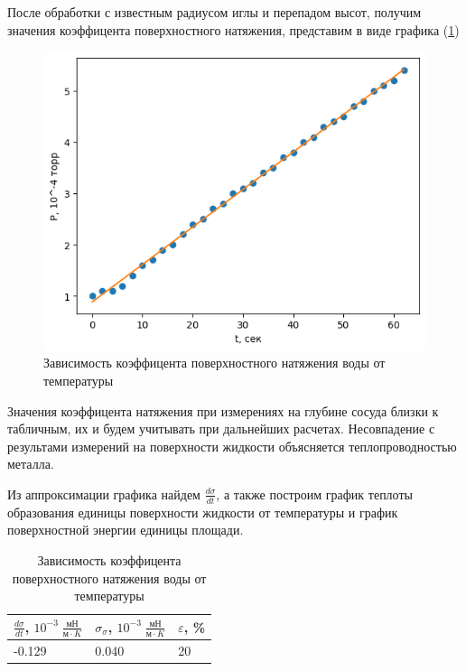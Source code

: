 \documentclass[a4paper,12pt]{article}
\begin{document}
После обработки с известным радиусом иглы и перепадом высот, получим значения коэффицента поверхностного натяжения, представим в виде графика (\ref{sigma})
\begin{figure}[H]
    \begin{center}
        \includegraphics[width=\textwidth]{data/plot1.png}
    \end{center}
    \caption{Зависимость коэффицента поверхностного натяжения воды от температуры} \label{sigma}
\end{figure}
Значения коэффицента натяжения при измерениях на глубине сосуда близки к табличным, их и будем учитывать при дальнейших расчетах. Несовпадение с результами измерений на поверхности жидкости объясняется теплопроводностью металла.

Из аппроксимации графика найдем $\frac{d\sigma}{dt}$, а также построим график теплоты образования единицы поверхности жидкости от температуры и график поверхностной энергии единицы площади.

\begin{table}[H]
    \caption{Зависимость коэффицента поверхностного натяжения воды от температуры}
    \label{dsigma}
    \begin{tabular}{|l|l|l|}
        \hline
        $\frac{d\sigma}{dt}$, $10^{-3}\;   \frac{\text{мН}}{\text{м} \cdot K}$ & $\sigma_\sigma$, $10^{-3}\; \frac{\text{мН}}{\text{м} \cdot K}$ & $\varepsilon$, \% \\ \hline
        -0.129                                                                 & 0.040                                                           & 20                \\ \hline
    \end{tabular}
\end{table}
\end{document}
